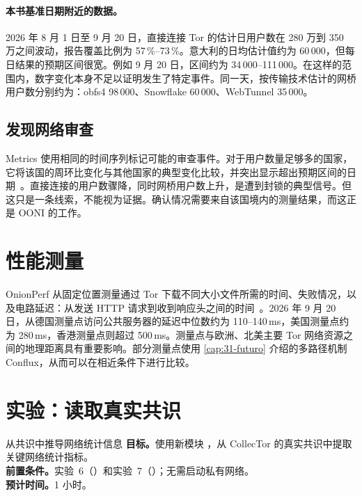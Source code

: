 \paragraph{本书基准日期附近的数据。}2026 年 8 月 1 日至 9 月 20 日，直接连接 Tor 的估计日用户数在 280 万到 350 万之间波动，报告覆盖比例为 57\,\%--73\,\%。意大利的日均估计值约为 60\,000，但每日结果的预期区间很宽。例如 9 月 20 日，区间约为 34\,000--111\,000。在这样的范围内，数字变化本身不足以证明发生了特定事件。同一天，按传输技术估计的网桥用户数分别约为：obfs4 98\,000、Snowflake 60\,000、WebTunnel 35\,000。

\subsection{发现网络审查}

Metrics 使用相同的时间序列标记可能的审查事件。对于用户数量足够多的国家，它将该国的周环比变化与其他国家的典型变化比较，并突出显示超出预期区间的日期~\cite{metricsreproducible}。直接连接的用户数骤降，同时网桥用户数上升，是遭到封锁的典型信号。但这只是一条线索，不能视为证据。确认情况需要来自该国境内的测量结果，而这正是 OONI 的工作。

\section{性能测量}\label{sec:metrics-prestazioni}

OnionPerf 从固定位置测量通过 Tor 下载不同大小文件所需的时间、失败情况，以及电路延迟：从发送 HTTP 请求到收到响应头之间的时间~\cite{metricsreproducible}。2026 年 9 月 20 日，从德国测量点访问公共服务器的延迟中位数约为 110--140\,ms，美国测量点约为 280\,ms，香港测量点则超过 500\,ms。测量点与欧洲、北美主要 Tor 网络资源之间的地理距离具有重要影响。部分测量点使用 \cref{cap:31-futuro} 介绍的多路径机制 Conflux，从而可以在相近条件下进行比较。

\section{实验：读取真实共识}\label{sec:lab-metrics}

\begin{laboratorio}[15]{从共识中推导网络统计信息}
\textbf{目标。}使用新模块 ，从 CollecTor 的真实共识中提取关键网络统计指标。\\
\textbf{前置条件。}实验~6（）和实验~7（）；无需启动私有网络。\\
\textbf{预计时间。}1 小时。
\end{laboratorio}

